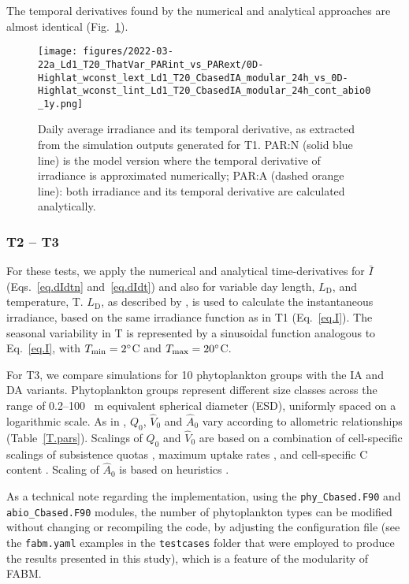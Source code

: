 \documentclass[gmd, manuscript]{copernicus}
\begin{document}
    The temporal derivatives found by the numerical and analytical approaches are almost identical (Fig.~\ref{f.T1light}).
    \begin{figure}[ht!]
    \texttt{[image: figures/2022-03-22a\_Ld1\_T20\_ThatVar\_PARint\_vs\_PARext/0D-Highlat\_wconst\_lext\_Ld1\_T20\_CbasedIA\_modular\_24h\_vs\_0D-Highlat\_wconst\_lint\_Ld1\_T20\_CbasedIA\_modular\_24h\_cont\_abio0\_1y.png]}
    \caption{Daily average irradiance and its temporal derivative, as extracted from the simulation outputs generated for T1. PAR:N (solid blue line) is the model version where the temporal derivative of irradiance is approximated numerically; PAR:A (dashed orange line): both irradiance and its temporal derivative are calculated analytically.\label{f.T1light}}
    \end{figure}

    \subsubsection{T2 -- T3}

    For these tests, we apply the numerical and analytical time-derivatives for $\bar{I}$ (Eqs.~\ref{eq.dIdtn} and~\ref{eq.dIdt}) and also for variable day length, $L_{\text{D}}$, and temperature, T\@. $L_{\text{D}}$, as described by \citet{Forsythe2003}, is used to calculate the instantaneous irradiance, based on the same irradiance function as in T1 (Eq.~\ref{eq.I}).  The seasonal variability in T is represented by a sinusoidal function analogous to Eq.~\eqref{eq.I}, with $T_{\min}=2^{\circ}$C and $T_{\max}=20^{\circ}$C.

    For T3, we compare simulations for 10 phytoplankton groups with the IA and DA variants. Phytoplankton groups represent different size classes across the range of 0.2--100 \unit{{\mu}m} equivalent spherical diameter (ESD), uniformly spaced on a logarithmic scale. As in \citet{Smith2016}, $Q_0$, $\hat{V}_0$ and $\hat{A}_0$ vary according to allometric relationships (Table~\ref{T.pars}). Scalings of $Q_0$ and $\hat{V}_0$ are based on a combination of cell-specific scalings of subsistence quotas \citep[][`marine species']{Edwards2012}, maximum uptake rates \citep{Maranon2013}, and cell-specific C content \citep[][`protist plankton excluding diatoms']{Menden2000}. Scaling of $\hat{A}_0$ is based on heuristics \citep{Smith2014a}.

As a technical note regarding the implementation, using the \verb|phy_Cbased.F90| and \verb|abio_Cbased.F90| modules, the number of phytoplankton types can be modified without changing or recompiling the code, by adjusting the configuration file (see the \verb|fabm.yaml| examples in the \verb|testcases| folder that were employed to produce the results presented in this study), which is a feature of the modularity of FABM\@.
\end{document}
